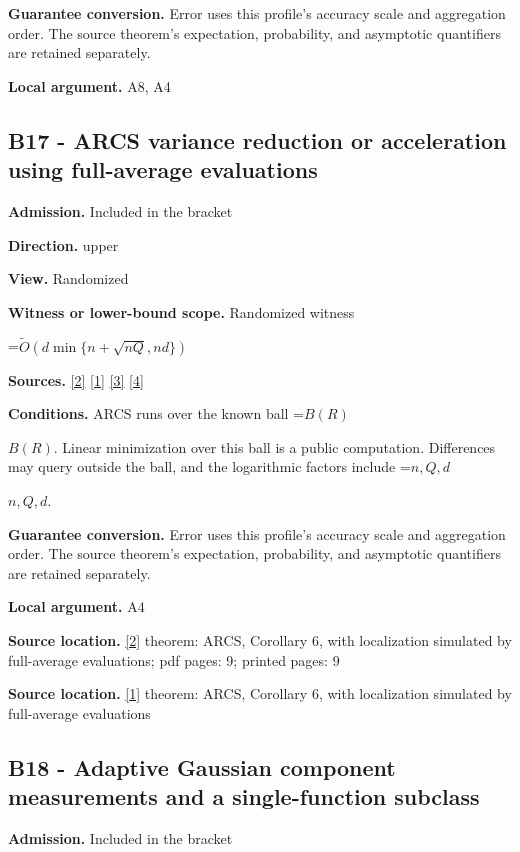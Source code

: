 \documentclass[10pt,a4paper]{article}
\newcommand{\AtlasMath}[1]{\par\begingroup\centering\setbox0=\hbox{$\displaystyle #1$}\ifdim\wd0>1.4\linewidth\typeout{ATLAS WIDE FORMULA: \the\wd0}\fi\ifdim\wd0>\linewidth\resizebox{\linewidth}{!}{\box0}\else\box0\fi\par\endgroup}
\newcommand{\AtlasInlineMath}[1]{\begingroup\setbox0=\hbox{$#1$}\ifdim\wd0>.4\linewidth\endgroup\AtlasMath{#1}\else\endgroup$#1$\fi}
\begin{document}
\textbf{Guarantee conversion.} Error uses this profile's accuracy scale and aggregation order. The source theorem's expectation, probability, and asymptotic quantifiers are retained separately.

\textbf{Local argument.} A8, A4

\subsection{B17 - ARCS variance reduction or acceleration using full-average evaluations}
\textbf{Admission.} Included in the bracket

\textbf{Direction.} upper

\textbf{View.} Randomized

\textbf{Witness or lower-bound scope.} Randomized witness

\AtlasMath{\widetilde{O}\!\left(d\min\{n+\sqrt{nQ},nd\}\right)}
\textbf{Sources.} \href{https://arxiv.org/abs/2109.08858}{[2]} \href{https://arxiv.org/html/2610.00345v1}{[1]} \href{https://arxiv.org/html/2607.16558v2}{[3]} \href{https://www.mathnet.ru/php/archive.phtml?jrnid=mzm&option_lang=eng&paperid=1697&wshow=paper}{[4]}

\textbf{Conditions.} ARCS runs over the known ball \AtlasInlineMath{B(R)}. Linear minimization over this ball is a public computation. Differences may query outside the ball, and the logarithmic factors include \AtlasInlineMath{n,Q,d}.

\textbf{Guarantee conversion.} Error uses this profile's accuracy scale and aggregation order. The source theorem's expectation, probability, and asymptotic quantifiers are retained separately.

\textbf{Local argument.} A4

\textbf{Source location.} \href{https://arxiv.org/abs/2109.08858}{[2]} theorem: ARCS, Corollary 6, with localization simulated by full-average evaluations; pdf pages: 9; printed pages: 9

\textbf{Source location.} \href{https://arxiv.org/html/2610.00345v1}{[1]} theorem: ARCS, Corollary 6, with localization simulated by full-average evaluations

\subsection{B18 - Adaptive Gaussian component measurements and a single-function subclass}
\textbf{Admission.} Included in the bracket
\end{document}
